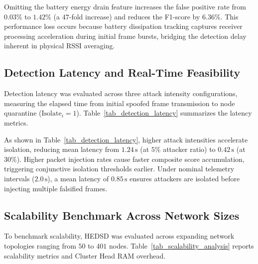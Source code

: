 \documentclass[conference]{IEEEtran}
\begin{document}
Omitting the battery energy drain feature increases the false positive rate from $0.03\%$ to $1.42\%$ (a $47$-fold increase) and reduces the F1-score by $6.36\%$. This performance loss occurs because battery dissipation tracking captures receiver processing acceleration during initial frame bursts, bridging the detection delay inherent in physical RSSI averaging.

\subsection{Detection Latency and Real-Time Feasibility}
Detection latency was evaluated across three attack intensity configurations, measuring the elapsed time from initial spoofed frame transmission to node quarantine ($\text{Isolate}_i = 1$). Table~\ref{tab_detection_latency} summarizes the latency metrics.

\begin{table}[htbp]
\caption{Spoofing Detection Latency vs. Attack Intensity Level}
\label{tab_detection_latency}
\centering
\small
\renewcommand{\arraystretch}{1.15}
\end{table}

As shown in Table~\ref{tab_detection_latency}, higher attack intensities accelerate isolation, reducing mean latency from $1.24\,\text{s}$ (at $5\%$ attacker ratio) to $0.42\,\text{s}$ (at $30\%$). Higher packet injection rates cause faster composite score accumulation, triggering conjunctive isolation thresholds earlier. Under nominal telemetry intervals ($2.0\,\text{s}$), a mean latency of $0.85\,\text{s}$ ensures attackers are isolated before injecting multiple falsified frames.

\subsection{Scalability Benchmark Across Network Sizes}
To benchmark scalability, HEDSD was evaluated across expanding network topologies ranging from $50$ to $401$ nodes. Table~\ref{tab_scalability_analysis} reports scalability metrics and Cluster Head RAM overhead.
\end{document}
